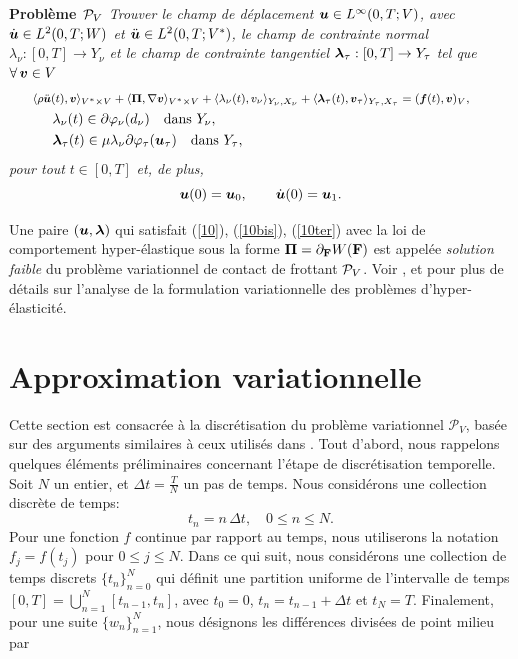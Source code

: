 {\textbf{Problème}\ ${\cal P}_V$}
{\it Trouver le champ de déplacement $\mbox{\boldmath{$u$}} \in L^\infty(0,T;V)$, avec $\dot{\mbox{\boldmath{$u$}}} \in L^2(0,T;W)$ et $\ddot{\mbox{\boldmath{$u$}}} \in L^2(0,T;V^*)$, le champ de contrainte normal $\lambda_{\nu}: [0,T]\rightarrow Y_\nu$ et le champ de contrainte tangentiel $\mbox{\boldmath{$\lambda$}}_{\tau} : [0,T]\rightarrow  Y_\tau$ tel que $\forall\,\mbox{\boldmath{$v$}}\in V$}
\begin{eqnarray}\label{weak0}\label{10}
&\hspace{-5mm} {\footnotesize\langle{\rho\ddot{\bu}(t),\bv}\rangle_{{V^*}\times{V}}+ \langle{\boldsymbol{\Pi},\nabla\bv}\rangle_{{V^*}\times{V}} +\langle \lambda_{\nu}(t),v_{\nu}\rangle_{Y_{\nu},X_{\nu}}+\langle \blambda_{\tau}(t),\bv_{\tau}\rangle_{Y_{\tau},X_{\tau}}=(\fb(t),\bv)_V,}\\
\label{weak}
&\label{10bis}\lambda_{\nu}(t) \in
\partial\varphi_\nu(d_{\nu})\quad {\rm dans}\ Y_\nu,\\
&\label{10ter}\blambda_{\tau}(t) \in \mu\lambda_{\nu}\partial\varphi_\tau({\bu}_{\tau}) \quad {\rm dans}\ Y_{\tau},
\end{eqnarray}{\it pour
	tout} $t\in [0,T]$ {\it et, de plus,}
\begin{equation}\label{BDSxx}
\mbox{\boldmath{$u$}}(0)=\mbox{\boldmath{$u$}}_0,\qquad\dot{\mbox{\boldmath{$u$}}}(0)=\mbox{\boldmath{$u$}}_1.
\end{equation}

Une paire $(\mbox{\boldmath{$u$}},\mbox{\boldmath{$\lambda$}})$ qui satisfait (\ref{10}), (\ref{10bis}), (\ref{10ter}) avec la loi de comportement hyper-élastique sous la forme $\boldsymbol{\Pi}=\partial_{\bf F} W({\bf F})$ est appelée {\it solution faible} du problème variationnel de contact de frottant ${\cal P}_V$. Voir \cite{ciarlet1988mathematical}, \cite{le1994numerical} et \cite{barboteu2018analysis} pour plus de détails sur l'analyse de la formulation variationnelle des problèmes d'hyper-élasticité.

\section{Approximation variationnelle}\label{approx_var}

Cette section est consacrée à la discrétisation du problème variationnel ${{\mathcal P}}_V$, basée sur des arguments similaires à ceux utilisés dans \cite{ayyad2009formulation,ayyad2009frictionless,barboteu2013analytical,barboteu2015dynamic,barboteu2014analysis,khenous2006hybrid,khenous2006discretization}. Tout d'abord, nous rappelons quelques éléments préliminaires concernant l'étape de discrétisation temporelle. Soit $ N $ un entier, et $\Delta t=\frac{T}{N}$ un pas de temps. Nous considérons une collection discrète de temps: 
\[ t_n=n\,\Delta t,\quad 0\le n\le N. \]
Pour une fonction $f$ continue par rapport au temps, nous utiliserons la notation $f_j=f(t_j)$ pour $0 \leq j \leq N$. Dans ce qui suit, nous considérons une collection de temps discrets $\{t_n\}_{n=0}^{N}$ qui définit une partition uniforme de l'intervalle de temps $[0,T]= \bigcup_{\scriptstyle n=1}^{N}[t_{n-1},t_{n}]$, avec $t_0=0$, $t_{n}=t_{n-1} + \Delta t$ et $t_N=T$. Finalement, pour une suite $\{w_n\}_{n=1}^N$, nous désignons les différences divisées de point milieu par

